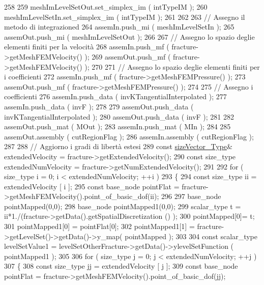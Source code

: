 \begin{DoxyCode}
258 
259     meshImLevelSetOut.set\_simplex\_im ( intTypeIM );
260     meshImLevelSetIn.set\_simplex\_im ( intTypeIM );
261 
262 
263     \textcolor{comment}{// Assegno il metodo di integrazioned}
264     assemIn.push\_mi ( meshImLevelSetIn );
265     assemOut.push\_mi ( meshImLevelSetOut );
266 
267     \textcolor{comment}{// Assegno lo spazio deglie elementi finiti per la velocità}
268     assemIn.push\_mf ( fracture->getMeshFEMVelocity() );
269     assemOut.push\_mf ( fracture->getMeshFEMVelocity() );
270 
271     \textcolor{comment}{// Assegno lo spazio deglie elementi finiti per i coefficienti}
272     assemIn.push\_mf ( fracture->getMeshFEMPressure() );
273     assemOut.push\_mf ( fracture->getMeshFEMPressure() );
274 
275     \textcolor{comment}{// Assegno i coefficienti}
276     assemIn.push\_data ( invKTangentialInterpolated );
277     assemIn.push\_data ( invF );
278 
279     assemOut.push\_data ( invKTangentialInterpolated );
280     assemOut.push\_data ( invF );
281 
282     assemOut.push\_mat ( MOut );
283     assemIn.push\_mat ( MIn );
284 
285     assemOut.assembly ( cutRegionFlag );
286     assemIn.assembly ( cutRegionFlag );
287 
288     \textcolor{comment}{// Aggiorno i gradi di libertà estesi}
289     \textcolor{keyword}{const} \hyperlink{Core_8h_a83c51913d041a5001e8683434c09857f}{sizeVector\_Type}& extendedVelocity = fracture->getExtendedVelocity();
290     \textcolor{keyword}{const} size\_type extendedNumVelocity = fracture->getNumExtendedVelocity();
291 
292     \textcolor{keywordflow}{for} ( size\_type i = 0; i < extendedNumVelocity; ++i )
293     \{
294         \textcolor{keyword}{const} size\_type ii = extendedVelocity [ i ];
295         \textcolor{keyword}{const} base\_node pointFlat = fracture->getMeshFEMVelocity().point\_of\_basic\_dof(ii);
296         
297         base\_node pointMapped(0,0);
298         base\_node pointMapped1(0,0);
299         scalar\_type t = ii*1./(fracture->getData().getSpatialDiscretization () );
300         pointMapped[0]= t;
301         pointMapped1[0] = pointFlat[0];
302         pointMapped1[1] = fracture->getLevelSet()->getData()->y\_map( pointMapped );
303     
304         \textcolor{keyword}{const} scalar\_type levelSetValue1 = levelSetOtherFracture->getData()->ylevelSetFunction ( 
      pointMapped1 );
305 
306         \textcolor{keywordflow}{for} ( size\_type j = 0; j < extendedNumVelocity; ++j )
307         \{
308             \textcolor{keyword}{const} size\_type jj = extendedVelocity [ j ];
309             \textcolor{keyword}{const} base\_node pointFlat = fracture->getMeshFEMVelocity().point\_of\_basic\_dof(jj);

\end{DoxyCode}
